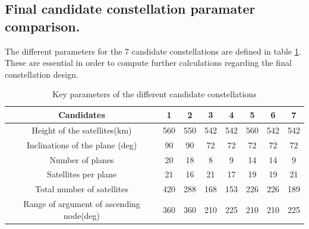 \subsection{Final candidate constellation paramater comparison.}


The different parameters for the 7 candidate constellations are defined in table \ref{candidateparameters}. These are essential in order to compute further calculations regarding the final constellation design. 


\begin{table}[h]
\centering
\begin{tabular}{ | c | c | c | c | c | c | c | c | }
\hline
	
	\textbf{Candidates} & \textbf{1} & \textbf{2} & \textbf{3} & \textbf{4} & \textbf{5} & \textbf{6} & \textbf{7} \\ \hline
	Height of the satellites(km) & 560 & 550 & 542 & 542 & 560 & 542 & 542 \\ \hline
	Inclinations of the plane (deg) & 90 & 90 & 72 & 72 & 72 & 72 & 72 \\ \hline
	Number of planes & 20 & 18 & 8 & 9 & 14 & 14 & 9 \\ \hline
	Satellites per plane & 21 & 16 & 21 & 17 & 19 & 19 & 21 \\ \hline
	Total number of satellites & 420 & 288 & 168 & 153 & 226 & 226 & 189\\ \hline
	Range of argument of ascending node(deg)& 360 & 360 & 210 & 225 & 210 & 210 & 225 \\ \hline
	
\end{tabular}
\caption{Key parameters of the different candidate constellations}\label{candidateparameters}
\end{table}
